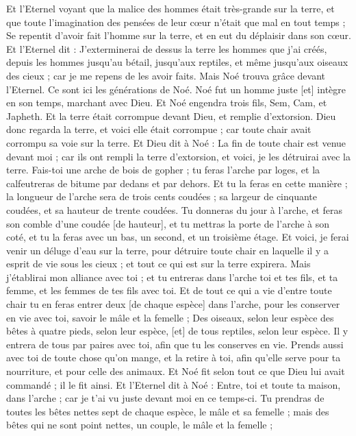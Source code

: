 \begin{multicols}{2}
Et l'Eternel voyant que la malice des hommes était très-grande sur la terre, et que toute l'imagination des pensées de leur cœur n'était que mal en tout temps ;
Se repentit d'avoir fait l'homme sur la terre, et en eut du déplaisir dans son cœur.
Et l'Eternel dit : J'exterminerai de dessus la terre les hommes que j'ai créés, depuis les hommes jusqu'au bétail, jusqu'aux reptiles, et même jusqu'aux oiseaux des cieux ; car je me repens de les avoir faits.
Mais Noé trouva grâce devant l'Eternel.
Ce sont ici les générations de Noé. Noé fut un homme juste [et] intègre en son temps, marchant avec Dieu.
Et Noé engendra trois fils, Sem, Cam, et Japheth.
Et la terre était corrompue devant Dieu, et remplie d'extorsion.
Dieu donc regarda la terre, et voici elle était corrompue ; car toute chair avait corrompu sa voie sur la terre.
Et Dieu dit à Noé : La fin de toute chair est venue devant moi ; car ils ont rempli la terre d'extorsion, et voici, je les détruirai avec la terre.
Fais-toi une arche de bois de gopher ; tu feras l'arche par loges, et la calfeutreras de bitume par dedans et par dehors.
Et tu la feras en cette manière ; la longueur de l'arche sera de trois cents coudées ; sa largeur de cinquante coudées, et sa hauteur de trente coudées.
Tu donneras du jour à l'arche, et feras son comble d'une coudée [de hauteur], et tu mettras la porte de l'arche à son coté, et tu la feras avec un bas, un second, et un troisième étage.
Et voici, je ferai venir un déluge d'eau sur la terre, pour détruire toute chair en laquelle il y a esprit de vie sous les cieux ; et tout ce qui est sur la terre expirera.
Mais j'établirai mon alliance avec toi ; et tu entreras dans l'arche toi et tes fils, et ta femme, et les femmes de tes fils avec toi.
Et de tout ce qui a vie d'entre toute chair tu en feras entrer deux [de chaque espèce] dans l'arche, pour les conserver en vie avec toi, savoir le mâle et la femelle ;
Des oiseaux, selon leur espèce des bêtes à quatre pieds, selon leur espèce, [et] de tous reptiles, selon leur espèce. Il y entrera de tous par paires avec toi, afin que tu les conserves en vie.
Prends aussi avec toi de toute chose qu'on mange, et la retire à toi, afin qu'elle serve pour ta nourriture, et pour celle des animaux.
Et Noé fit selon tout ce que Dieu lui avait commandé ; il le fit ainsi.
\VerseOne{}Et l'Eternel dit à Noé : Entre, toi et toute ta maison, dans l'arche ; car je t'ai vu juste devant moi en ce temps-ci.
Tu prendras de toutes les bêtes nettes sept de chaque espèce, le mâle et sa femelle ; mais des bêtes qui ne sont point nettes, un couple, le mâle et la femelle ;

\end{multicols}
